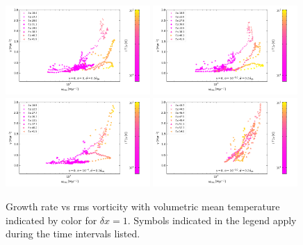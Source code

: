 \documentclass[preprint2]{aastex63}
\newcommand\dx{ {\delta x}}
\begin{document}
\begin{figure}
\centering
\includegraphics[trim=0.2cm 1.4cm 0.5cm 0.2cm,clip=true,width=0.49\textwidth]{csc_figs/gvw-1pcPm0e-0.0.png}
\includegraphics[trim=0.2cm 1.4cm 0.5cm 0.2cm,clip=true,width=0.49\textwidth]{csc_figs/gvw-1pcPm0e-5.0.png}
\includegraphics[trim=0.2cm 0.2cm 0.5cm 0.2cm,clip=true,width=0.49\textwidth]{csc_figs/gvw-1pcPm0e-4.0.png}
\includegraphics[trim=0.2cm 0.2cm 0.5cm 0.2cm,clip=true,width=0.49\textwidth]{csc_figs/gvw-1pcPm0e-3.0.png}
\caption{
Growth rate vs rms vorticity with volumetric mean temperature indicated by 
color for $\dx=1$.
Symbols indicated in the legend apply during the time intervals listed.
\label{fig:lsd-power}
}
\end{figure}
\end{document}
